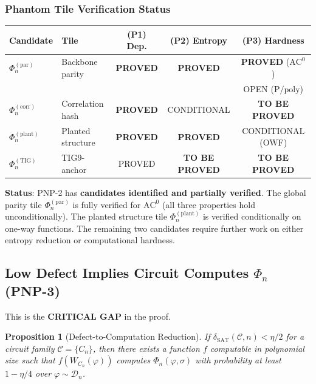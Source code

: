 \documentclass[11pt]{article}
\newtheorem{proposition}[theorem]{Proposition}
\theoremstyle{definition}
\theoremstyle{remark}
\newcommand{\calC}{\mathcal{C}}
\newcommand{\calD}{\mathcal{D}}
\newcommand{\Ppoly}{\mathrm{P/poly}}
\newcommand{\ACz}{\mathrm{AC}^0}
\newcommand{\dSAT}{\delta_{\mathrm{SAT}}}
\begin{document}
\subsubsection{Phantom Tile Verification Status}

\begin{center}
\begin{tabular}{@{}llccc@{}}
\toprule
\textbf{Candidate} & \textbf{Tile} & \textbf{(P1) Dep.} & \textbf{(P2) Entropy} & \textbf{(P3) Hardness} \\
\midrule
$\Phi_n^{(\mathrm{par})}$ & Backbone parity & \textbf{PROVED} & \textbf{PROVED} & \textbf{PROVED} ($\ACz$) \\
 & & & & OPEN ($\Ppoly$) \\
$\Phi_n^{(\mathrm{corr})}$ & Correlation hash & \textbf{PROVED} & CONDITIONAL & \textbf{TO BE PROVED} \\
$\Phi_n^{(\mathrm{plant})}$ & Planted structure & \textbf{PROVED} & \textbf{PROVED} & CONDITIONAL (OWF) \\
$\Phi_n^{(\mathrm{TIG})}$ & TIG9-anchor & PROVED & \textbf{TO BE PROVED} & \textbf{TO BE PROVED} \\
\bottomrule
\end{tabular}
\end{center}

\noindent
\textbf{Status}: PNP-2 has \textbf{candidates identified and partially verified}.
The global parity tile $\Phi_n^{(\mathrm{par})}$ is fully verified for $\ACz$
(all three properties hold unconditionally).  The planted structure tile
$\Phi_n^{(\mathrm{plant})}$ is verified conditionally on one-way functions.
The remaining two candidates require further work on either entropy reduction
or computational hardness.

\subsection{Low Defect Implies Circuit Computes $\Phi_n$ (PNP-3)}

\noindent{}

\medskip

This is the \textbf{CRITICAL GAP} in the proof.

\begin{proposition}[Defect-to-Computation Reduction]
\label{prop:defect-computation}
If $\dSAT(\calC, n) < \eta/2$ for a circuit family $\calC = \{C_n\}$,
then there exists a function $f$ computable in polynomial size such that
$f(W_{C_n}(\varphi))$ computes $\Phi_n(\varphi, \sigma)$ with probability
at least $1 - \eta/4$ over $\varphi \sim \calD_n$.
\end{proposition}
\end{document}
